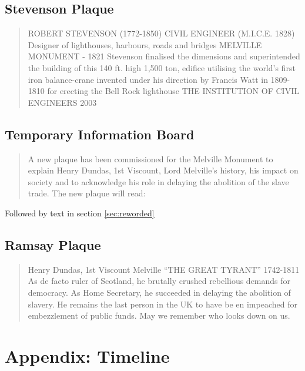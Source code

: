 \documentclass{scrartcl}
\begin{document}
\begin{appendices}
\subsection{Stevenson Plaque}\label{sec:stevenson}

\begin{quotation}
ROBERT STEVENSON (1772-1850)
CIVIL ENGINEER (M.I.C.E. 1828)
Designer of lighthouses, harbours, roads and bridges
MELVILLE MONUMENT - 1821 Stevenson finalised the dimensions and superintended the building of this 140 ft. high 1,500 ton, edifice utilising the world's first iron balance-crane invented under
his direction by Francis Watt in 1809-1810 for erecting the Bell Rock lighthouse
THE INSTITUTION OF CIVIL ENGINEERS
2003
\end{quotation}

\subsection{Temporary Information Board}\label{sec:temporary}


\begin{quotation}
A new plaque has been commissioned for the Melville Monument to explain Henry Dundas, 1st Viscount, Lord Melville's history, his impact on society and to acknowledge his role in delaying the abolition of the slave trade.
The new plaque will read:
\end{quotation}

Followed by text in section \ref{sec:reworded}

\subsection{Ramsay Plaque}

\begin{quotation}
Henry Dundas, 1st Viscount Melville
``THE GREAT TYRANT''
1742-1811
As de facto ruler of Scotland, he brutally crushed rebellious demands for democracy.
As Home Secretary, he succeeded in delaying the abolition of slavery.
He remains the last person in the UK to have be     en impeached for embezzlement of public funds.
May we remember who looks down on us.
\end{quotation}

\section{Appendix: Timeline}\label{sec:timeline}


\end{appendices}
\end{document}
